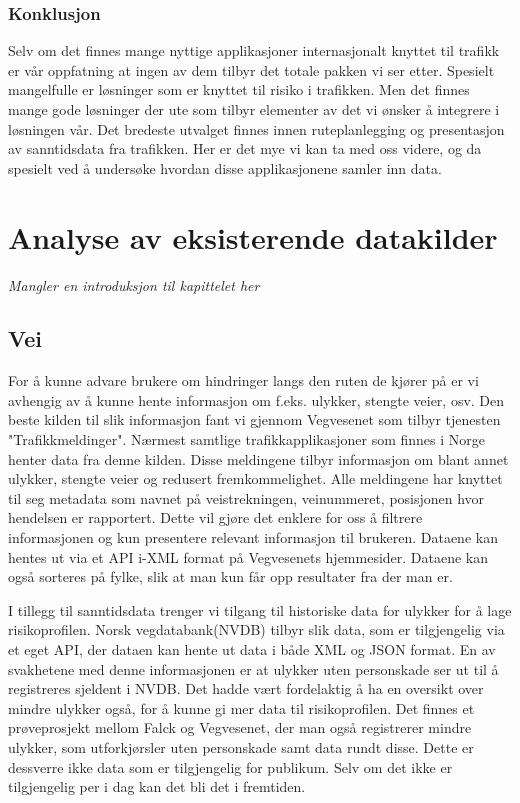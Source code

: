 \documentclass[a4paper,norsk,oneside]{book}
\begin{document}
\subsection{Konklusjon}
Selv om det finnes mange nyttige applikasjoner internasjonalt knyttet til trafikk er vår oppfatning at ingen av dem tilbyr det totale pakken vi ser etter. Spesielt mangelfulle er løsninger som er knyttet til risiko i trafikken. Men det finnes mange gode løsninger der ute som tilbyr elementer av det vi ønsker å integrere i løsningen vår. Det bredeste utvalget finnes innen ruteplanlegging og presentasjon av sanntidsdata fra trafikken. Her er det mye vi kan ta med oss videre, og da spesielt ved å undersøke hvordan disse applikasjonene samler inn data.

\chapter{Analyse av eksisterende datakilder}
\label{sec:datakilderl}
{ \it Mangler en introduksjon til kapittelet her} 

\section{Vei}
For å kunne advare brukere om hindringer langs den ruten de kjører på er vi avhengig av å kunne hente informasjon om f.eks. ulykker, stengte veier, osv. Den beste kilden til slik informasjon fant vi gjennom Vegvesenet som tilbyr tjenesten "Trafikkmeldinger". Nærmest samtlige trafikkapplikasjoner som finnes i Norge henter data fra denne kilden. Disse meldingene tilbyr informasjon om blant annet ulykker, stengte veier og redusert fremkommelighet. Alle meldingene har knyttet til seg metadata som navnet på veistrekningen, veinummeret, posisjonen hvor hendelsen er rapportert. Dette vil gjøre det enklere for oss å filtrere informasjonen og kun presentere relevant informasjon til brukeren. Dataene kan hentes ut via et API i-XML format på Vegvesenets hjemmesider. Dataene kan også sorteres på fylke, slik at man kun får opp resultater fra der man er.

I tillegg til sanntidsdata trenger vi tilgang til historiske data for ulykker for å lage risikoprofilen. Norsk vegdatabank(NVDB) tilbyr slik data, som er tilgjengelig via et eget API, der dataen kan hente ut data i både XML og JSON format. En av svakhetene med denne informasjonen er at ulykker uten personskade ser ut til å registreres sjeldent i NVDB. Det hadde vært fordelaktig å ha en oversikt over mindre ulykker også, for å kunne gi mer data til risikoprofilen. Det finnes et prøveprosjekt mellom Falck og Vegvesenet, der man også registrerer mindre ulykker, som utforkjørsler uten personskade samt data rundt disse. Dette er dessverre ikke data som er tilgjengelig for publikum. Selv om det ikke er tilgjengelig per i dag kan det bli det i fremtiden.
\end{document}
